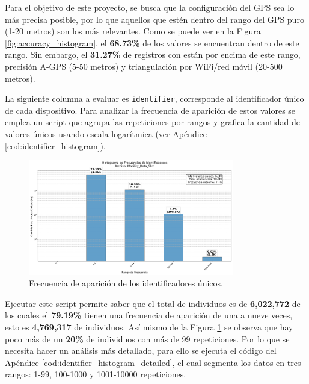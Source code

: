 Para el objetivo de este proyecto, se busca que la configuración del GPS sea lo más precisa posible, por lo que aquellos que estén dentro del rango del GPS puro (1-20 metros) son los más relevantes. Como se puede ver en la Figura \ref{fig:accuracy_histogram}, el \textbf{68.73\%} de los valores se encuentran dentro de este rango. Sin embargo, el \textbf{31.27\%} de registros con están por encima de este rango, precisión A-GPS (5-50 metros) y triangulación por WiFi/red móvil (20-500 metros).

La siguiente columna a evaluar es \texttt{identifier}, corresponde al identificador único de cada dispositivo.  Para analizar la frecuencia de aparición de estos valores se emplea un script que agrupa las repeticiones por rangos y grafica la cantidad de valores únicos usando escala logarítmica (ver Apéndice \ref{cod:identifier_histogram}).

\begin{figure}[H]
    \centering
    \includegraphics[width=0.8\textwidth]{img/histograma_identifier_Mobility_Data_Slim.png}
    \caption{Frecuencia de aparición de los identificadores únicos.}
    \label{fig:identifier_histogram}
\end{figure}

 Ejecutar este script permite saber que el total de individuos es de \textbf{6,022,772} de los cuales el \textbf{79.19\%} tienen una frecuencia de aparición de una a nueve veces, esto es \textbf{4,769,317} de individuos. Así mismo de la Figura \ref{fig:identifier_histogram} se observa que hay poco más de un \textbf{20\%} de individuos con más de 99 repeticiones. Por lo que se necesita hacer un análisis más detallado, para ello se ejecuta el código del Apéndice \ref{cod:identifier_histogram_detailed}, el cual segmenta los datos en tres rangos: 1-99, 100-1000 y 1001-10000 repeticiones.

